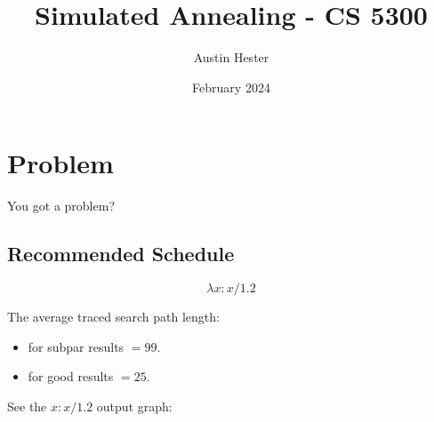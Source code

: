 \documentclass{article}
\title{Simulated Annealing - CS 5300}
\author{Austin Hester}
\date{February 2024}
\begin{document}
\maketitle

\section{Problem}

You got a problem?

\subsection{Recommended Schedule}

$$\lambda x : x / 1.2$$

The average traced search path length:

\begin{itemize}
    \item for subpar results $= 99$.
    \item for good results $= 25$.
\end{itemize}

See the $x : x / 1.2$ output graph:
\end{document}
